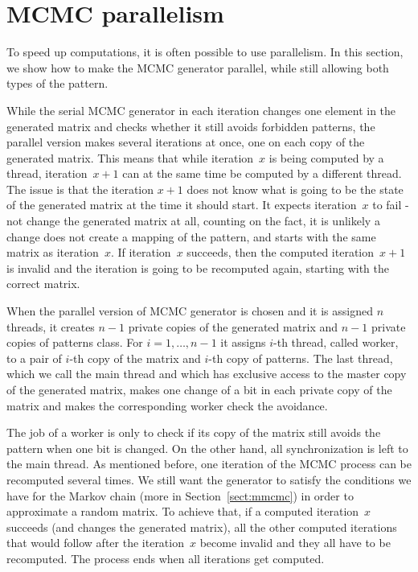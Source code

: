 \section{MCMC parallelism}
\label{sect:parallel}
To speed up computations, it is often possible to use parallelism. In this section, we show how to make the MCMC generator parallel, while still allowing both types of the pattern.

While the serial MCMC generator in each iteration changes one element in the generated matrix and checks whether it still avoids forbidden patterns, the parallel version makes several iterations at once, one on each copy of the generated matrix. This means that while iteration~$x$ is being computed by a thread, iteration~$x+1$ can at the same time be computed by a different thread. The issue is that the iteration $x+1$ does not know what is going to be the state of the generated matrix at the time it should start. It expects iteration~$x$ to fail - not change the generated matrix at all, counting on the fact, it is unlikely a change does not create a mapping of the pattern, and starts with the same matrix as iteration~$x$. If iteration~$x$ succeeds, then the computed iteration~$x+1$ is invalid and the iteration is going to be recomputed again, starting with the correct matrix.

When the parallel version of MCMC generator is chosen and it is assigned $n$ threads, it creates $n-1$ private copies of the generated matrix and $n-1$ private copies of patterns class. For $i=1,\dots,n-1$ it assigns $i$-th thread, called worker, to a pair of $i$-th copy of the matrix and $i$-th copy of patterns. The last thread, which we call the main thread and which has exclusive access to the master copy of the generated matrix, makes one change of a bit in each private copy of the matrix and makes the corresponding worker check the avoidance.

The job of a worker is only to check if its copy of the matrix still avoids the pattern when one bit is changed. On the other hand, all synchronization is left to the main thread. As mentioned before, one iteration of the MCMC process can be recomputed several times. We still want the generator to satisfy the conditions we have for the Markov chain (more in Section~\ref{sect:mmcmc}) in order to approximate a random matrix. To achieve that, if a computed iteration~$x$ succeeds (and changes the generated matrix), all the other computed iterations that would follow after the iteration~$x$ become invalid and they all have to be recomputed. The process ends when all iterations get computed.

